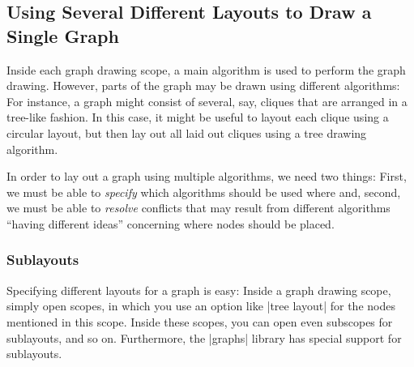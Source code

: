 





\subsection{Using Several Different Layouts to Draw a Single Graph}
\label{section-gd-sublayouts}

Inside each graph drawing scope, a main algorithm is used to perform the graph
drawing. However, parts of the graph may be drawn using different algorithms:
For instance, a graph might consist of several, say, cliques that are arranged
in a tree-like fashion. In this case, it might be useful to layout each clique
using a circular layout, but then lay out all laid out cliques using a tree
drawing algorithm.

In order to lay out a graph using multiple algorithms, we need two things:
First, we must be able to \emph{specify} which algorithms should be used where
and, second, we must be able to \emph{resolve} conflicts that may result from
different algorithms ``having different ideas'' concerning where nodes should
be placed.


\subsubsection{Sublayouts}

Specifying different layouts for a graph is easy: Inside a graph drawing scope,
simply open scopes, in which you use an option like |tree layout| for the nodes
mentioned in this scope. Inside these scopes, you can open even subscopes for
sublayouts, and so on. Furthermore, the |graphs| library has special support
for sublayouts.

